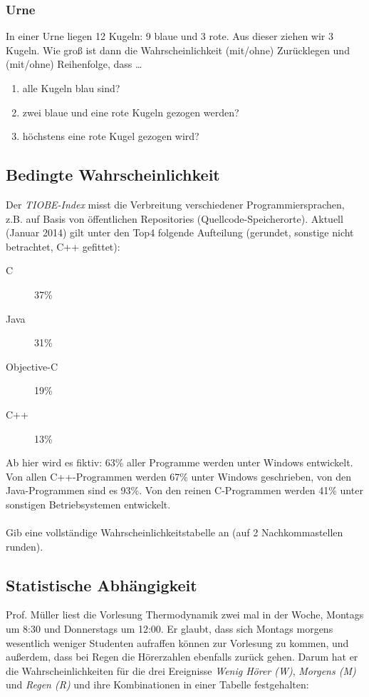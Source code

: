 \documentclass[11pt, a4paper]{article}
\begin{document}
\subsubsection{Urne}
In einer Urne liegen 12 Kugeln: 9 blaue und 3 rote. Aus dieser ziehen wir 3 Kugeln. Wie groß ist dann die Wahrscheinlichkeit (mit/ohne) Zurücklegen und (mit/ohne) Reihenfolge, dass \dots
\begin{enumerate}
	\item alle Kugeln blau sind?
	\item zwei blaue und eine rote Kugeln gezogen werden?
	\item höchstens eine rote Kugel gezogen wird?
\end{enumerate}

\subsection{Bedingte Wahrscheinlichkeit}
Der \textit{TIOBE-Index} misst die Verbreitung verschiedener Programmiersprachen, z.B. auf Basis von öffentlichen Repositories (Quellcode-Speicherorte). Aktuell (Januar 2014) gilt unter den Top4 folgende Aufteilung (gerundet, sonstige nicht betrachtet, C++ gefittet):
\begin{description}
	\item[C] 37\%
	\item[Java] 31\%
	\item[Objective-C] 19\%
	\item[C++] 13\%
\end{description}
Ab hier wird es fiktiv: 63\% aller Programme werden unter Windows entwickelt. Von allen C++-Programmen werden 67\% unter Windows geschrieben, von den Java-Programmen sind es 93\%. Von den reinen C-Programmen werden 41\% unter sonstigen Betriebsystemen entwickelt. \\
\\
Gib eine vollständige Wahrscheinlichkeitstabelle an (auf 2 Nachkommastellen runden).

\subsection{Statistische Abhängigkeit}
Prof. Müller liest die Vorlesung Thermodynamik zwei mal in der Woche, Montags um 8:30 und Donnerstags um 12:00. Er glaubt, dass sich Montags morgens wesentlich weniger Studenten aufraffen können zur Vorlesung zu kommen, und außerdem, dass bei Regen die Hörerzahlen ebenfalls zurück gehen. Darum hat er die Wahrscheinlichkeiten für die drei Ereignisse \emph{Wenig Hörer (W)}, \emph{Morgens (M)} und \emph{Regen (R)} und ihre Kombinationen in einer Tabelle festgehalten: \\
\end{document}
